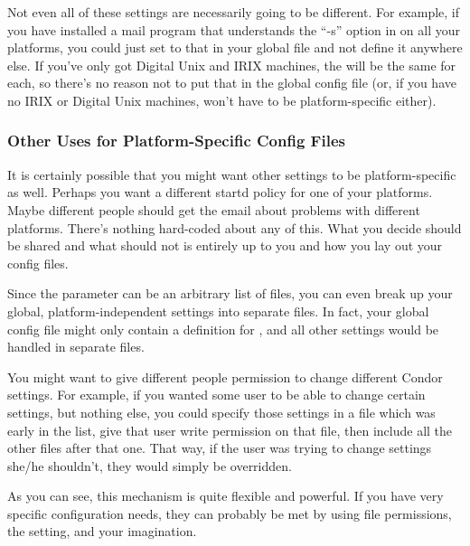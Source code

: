 Not even all of these settings are necessarily going to be different.
For example, if you have installed a mail program that understands the
``-s'' option in  on all your platforms, you
could just set  to that in your global file and not define
it anywhere else.  If you've only got Digital Unix and IRIX machines,
the  will be the same for each, so there's no
reason not to put that in the global config file (or, if you have no
IRIX or Digital Unix machines,  won't have to be
platform-specific either).

\subsubsection{\label{sec:Other-Uses-for-Platform-Files}Other Uses for
Platform-Specific Config Files} 

It is certainly possible that you might want other settings to be
platform-specific as well.  Perhaps you want a different startd policy
for one of your platforms.  Maybe different people should get the
email about problems with different platforms.  There's nothing
hard-coded about any of this.  What you decide should be shared and
what should not is entirely up to you and how you lay out your config
files.

Since the  parameter can be an arbitrary
list of files, you can even break up your global, platform-independent
settings into separate files.  In fact, your global config file might
only contain a definition for , and all
other settings would be handled in separate files.  

You might want to give different people permission to change different
Condor settings.  For example, if you wanted some user to be able to
change certain settings, but nothing else, you could specify those
settings in a file which was early in the 
list, give that user write permission on that file, then include all
the other files after that one.  That way, if the user was trying to
change settings she/he shouldn't, they would simply be overridden.  

As you can see, this mechanism is quite flexible and powerful.  If you
have very specific configuration needs, they can probably be met by
using file permissions, the  setting, and
your imagination.

